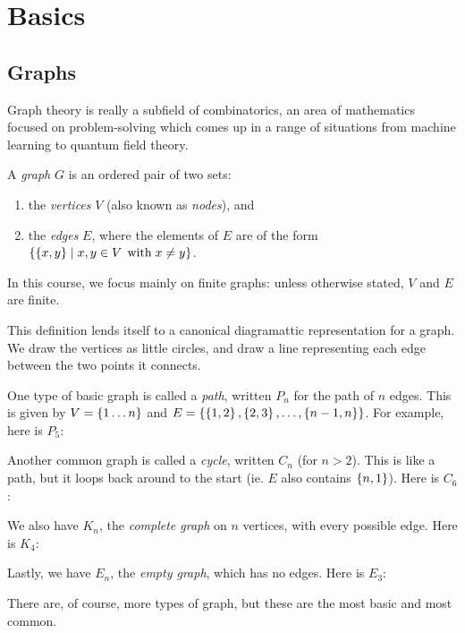 \documentclass{article}
\begin{document}
\makecover

\section{Basics}
\subsection{Graphs}

Graph theory is really a subfield of combinatorics, an area of mathematics focused on problem-solving which comes up in a range of situations from machine learning to quantum field theory.

\begin{definition}[Graph]
	A \textit{graph} $G$ is an ordered pair of two sets:
	\begin{enumerate}
		\item the \textit{vertices} $V$ (also known as \textit{nodes}), and
		\item the \textit{edges} $E$, where the elements of $E$ are of the form $\left\lbrace \left\lbrace x, y \right\rbrace \mid x, y \in V \mathrel{\, \text{with}} x \neq y \right\rbrace$.
	\end{enumerate}
	In this course, we focus mainly on finite graphs: unless otherwise stated, $V$ and $E$ are finite.
\end{definition}

This definition lends itself to a canonical diagramattic representation for a graph. We draw the vertices as little circles, and draw a line representing each edge between the two points it connects.

\begin{example}
	One type of basic graph is called a \textit{path}, written $P_n$ for the path of $n$ edges. This is given by $V = \left\lbrace 1 \ldots n \right\rbrace$ and $E = \left\lbrace \left\lbrace 1, 2 \right\rbrace, \left\lbrace 2, 3 \right\rbrace, \ldots , \left\lbrace n-1, n \right\rbrace  \right\rbrace$. For example, here is $P_5$:


	Another common graph is called a \textit{cycle}, written $C_n$ (for $n>2$). This is like a path, but it loops back around to the start (ie. $E$ also contains $\left\lbrace n, 1 \right\rbrace$). Here is $C_6$:


	We also have $K_n$, the \textit{complete graph} on $n$ vertices, with every possible edge. Here is $K_4$:


	Lastly, we have $E_n$, the \textit{empty graph}, which has no edges. Here is $E_3$:


	There are, of course, more types of graph, but these are the most basic and most common.
\end{example}
\end{document}
